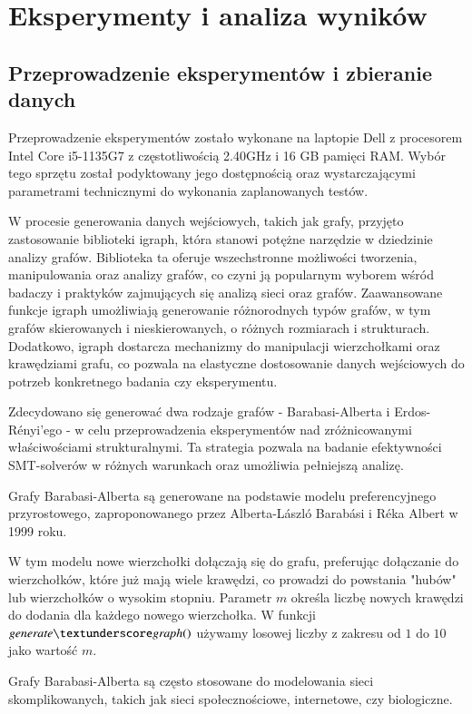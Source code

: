 \chapter{Eksperymenty i analiza wyników}
\section{Przeprowadzenie eksperymentów i zbieranie danych}

Przeprowadzenie eksperymentów zostało wykonane na laptopie Dell z procesorem Intel Core i5-1135G7 z częstotliwością 2.40GHz i 16 GB pamięci RAM. Wybór tego sprzętu został podyktowany jego dostępnością oraz wystarczającymi parametrami technicznymi do wykonania zaplanowanych testów.

W procesie generowania danych wejściowych, takich jak grafy, przyjęto zastosowanie biblioteki igraph, która stanowi potężne narzędzie w dziedzinie analizy grafów. Biblioteka ta oferuje wszechstronne możliwości tworzenia, manipulowania oraz analizy grafów, co czyni ją popularnym wyborem wśród badaczy i praktyków zajmujących się analizą sieci oraz grafów. Zaawansowane funkcje igraph umożliwiają generowanie różnorodnych typów grafów, w tym grafów skierowanych i nieskierowanych, o różnych rozmiarach i strukturach. Dodatkowo, igraph dostarcza mechanizmy do manipulacji wierzchołkami oraz krawędziami grafu, co pozwala na elastyczne dostosowanie danych wejściowych do potrzeb konkretnego badania czy eksperymentu. 

Zdecydowano się generować dwa rodzaje grafów - Barabasi-Alberta i Erdos-Rényi'ego - w celu przeprowadzenia eksperymentów nad zróżnicowanymi właściwościami strukturalnymi. Ta strategia pozwala na badanie efektywności SMT-solverów w różnych warunkach oraz umożliwia pełniejszą analizę. 

Grafy Barabasi-Alberta są generowane na podstawie modelu preferencyjnego przyrostowego, zaproponowanego przez Alberta-László Barabási i Réka Albert w 1999 roku.

W tym modelu nowe wierzchołki dołączają się do grafu, preferując dołączanie do wierzchołków, które już mają wiele krawędzi, co prowadzi do powstania "hubów" lub wierzchołków o wysokim stopniu.
Parametr $m$ określa liczbę nowych krawędzi do dodania dla każdego nowego wierzchołka. W funkcji $\generategraph$ używamy losowej liczby z zakresu od $1$ do $10$ jako wartość $m$.

Grafy Barabasi-Alberta są często stosowane do modelowania sieci skomplikowanych, takich jak sieci społecznościowe, internetowe, czy biologiczne.

